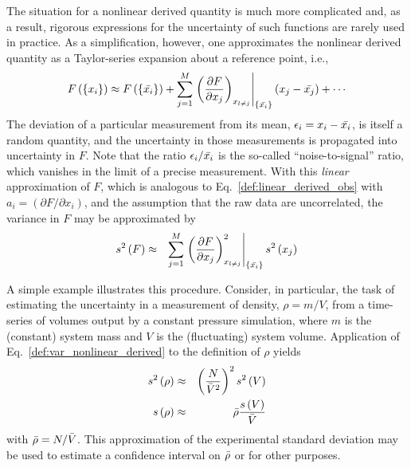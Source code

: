 The situation for a nonlinear derived quantity is much more complicated and, as a result, rigorous expressions for the uncertainty of such functions are rarely used in practice. As a simplification, however, one approximates the nonlinear derived quantity as a Taylor-series expansion about a reference point, i.e.,
%
\begin{equation}
  F\left( \left\{x_i\right\} \right)
  \approx
  F\left( \left\{\mean{x_i}\right\} \right)
  + \sum_{j=1}^M \left.
    \left( \dfrac{\partial F}{\partial x_j}\right)_{x_{l \neq j}}
  \right|_{\left\{\mean{x_i}\right\}}
  \left(x_j - \mean{x_j}\right) + \cdots
  \label{def:nonlinear_derived_obs_taylor}
\end{equation}
%
The deviation of a particular measurement from its mean, $\epsilon_i = x_i - \bar{x_i}$, is itself a random quantity, and the uncertainty in those measurements is propagated into uncertainty in $F$.
Note that the ratio $\epsilon_i/\bar{x_i}$ is the so-called ``noise-to-signal'' ratio, which vanishes in the limit of a precise measurement. 
With this {\it linear} approximation of $F$, which is analogous to Eq.~\ref{def:linear_derived_obs} with $a_i = \left( \partial F/\partial x_i\right)$, and the assumption that the raw data are uncorrelated, the variance in $F$ may be approximated by
%
\begin{eqnarray}
  s^2\left( F \right) & \approx & \sum_{j=1}^M
                \left.
                \left( \dfrac{\partial F}{\partial x_j} \right)_{x_{l \neq j}} ^2
                \right|_{\left\{\bar{x_i}\right\}}
                s^2\left( x_j \right)
  \label{def:var_nonlinear_derived}
\end{eqnarray}
%

A simple example illustrates this procedure.
Consider, in particular, the task of estimating the uncertainty in a measurement of density, $\rho=m/V$, from a time-series of volumes output by a constant pressure simulation, where $m$ is the (constant) system mass and $V$ is the (fluctuating) system volume.
Application of Eq.~\ref{def:var_nonlinear_derived} to the definition of $\rho$ yields
%
\begin{eqnarray}
  s^2\left( \rho \right) & \approx & \left( \dfrac{N}{\bar{V}^2} \right)^2 s^2\left( V \right) \\
  s\left( \rho \right) & \approx & \bar{\rho} \dfrac{s\left( V \right)}{\bar{V}}
  \label{ex:density_linearized}
\end{eqnarray}
%
with $\bar{\rho} = N/\bar{V}$.
This approximation of the experimental standard deviation may be used to estimate a confidence interval on $\bar{\rho}$ or for other purposes.

